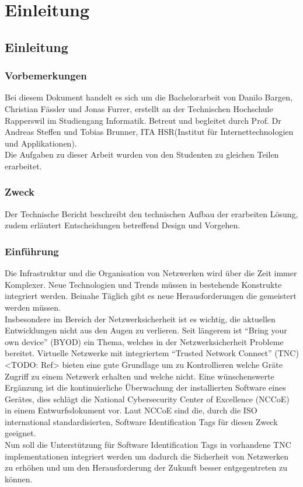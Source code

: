 \chapter{Einleitung}
\section{Einleitung}

\subsection{Vorbemerkungen}
Bei diesem Dokument handelt es sich um die Bachelorarbeit von Danilo Bargen,
Christian Fässler und Jonas Furrer, erstellt an der Technischen Hochschule
Rapperswil im Studiengang Informatik. Betreut und begleitet durch Prof. Dr
Andreas Steffen und Tobias Brunner, ITA HSR(Institut für Internettechnologien
und Applikationen).\\
Die Aufgaben zu dieser Arbeit wurden von den Studenten zu gleichen Teilen
erarbeitet.

\subsection{Zweck}
Der Technische Bericht beschreibt den technischen Aufbau der erarbeiten Lösung,
zudem erläutert Entscheidungen betreffend Design und Vorgehen.

\subsection{Einführung}
Die Infrastruktur und die Organisation von Netzwerken wird über die Zeit immer
Komplexer. Neue Technologien und Trends müssen in bestehende Konstrukte
integriert werden. Beinahe Täglich gibt es  neue Herausforderungen die
gemeistert werden müssen.\\
Insbesondere im Bereich der Netzwerksicherheit ist es wichtig, die aktuellen
Entwicklungen nicht aus den Augen zu verlieren. Seit längerem ist \enquote{Bring
your own device} (BYOD) ein Thema, welches in der Netzwerksicherheit Probleme
bereitet. Virtuelle Netzwerke mit integriertem \enquote{Trusted Network Connect}
(TNC) <TODO: Ref> bieten eine gute Grundlage um zu Kontrollieren welche Gräte
Zugriff zu einem Netzwerk erhalten und welche nicht. Eine wünschenswerte
Ergänzung ist die kontinuierliche Überwachung der installierten Software eines
Gerätes, dies schlägt die National Cybersecurity Center of Excellence (NCCoE) in
einem Entwurfsdokument vor. Laut NCCoE sind die, durch die ISO international
standardisierten, Software Identification Tags für diesen Zweck geeignet.\\
Nun soll die Unterstützung für Software Identification Tags in vorhandene TNC
implementationen integriert werden um dadurch die Sicherheit von Netzwerken zu
erhöhen und um den Herausforderung der Zukunft besser entgegentreten zu können.